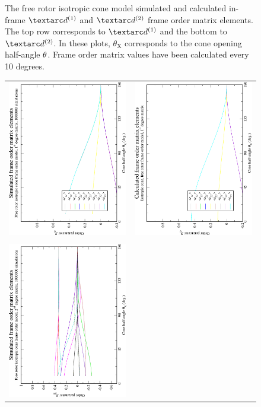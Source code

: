 \begin{figure}
\begin{tabular}{@{}cc@{}}
  \end{tabular}
  \caption[Free-rotor isotropic cone simulated and calculated in-frame Daeg$^{(1)}$ and Daeg$^{(2)}$ elements.]{
    The free rotor isotropic cone model simulated and calculated in-frame $\FOone$ and $\FOtwo$ frame order matrix elements.
    The top row corresponds to $\FOone$ and the bottom to $\FOtwo$.
    In these plots, $\theta_\textrm{X}$ corresponds to the cone opening half-angle $\theta$.
    Frame order matrix values have been calculated every 10 degrees.
  }
  \label{fig: simulated and calculated in-frame 1st and 2nd degree iso cone, free rotor frame order}
\end{figure}

\begin{figure}
\centering
  \begin{tabular}{@{}cc@{}}
    \includegraphics[width=.35\textwidth,angle=270]{images/frame_order_matrix/Sij_iso_cone_free_rotor_out_of_frame_theta_x_ens1000000.eps} &
    \includegraphics[width=.35\textwidth,angle=270]{images/frame_order_matrix/Sij_iso_cone_free_rotor_out_of_frame_theta_x_calc.eps} \\
    \\[-5pt]
    \includegraphics[width=.35\textwidth,angle=270]{images/frame_order_matrix/Sijkl_iso_cone_free_rotor_out_of_frame_theta_x_ens1000000.eps} &

\end{tabular}
\end{figure}
